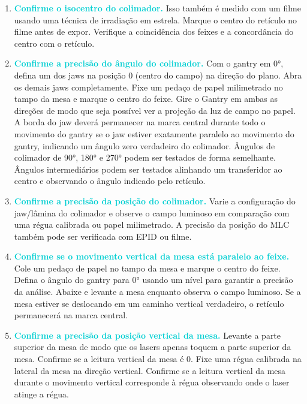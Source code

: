 \documentclass[11pt,a4paper]{article}
\begin{document}
\begin{enumerate}[label=\textcolor{CarnationPink}{\arabic*${}^\circ $}]
		\item \textcolor{DarkTurquoise}{\textbf{Confirme o isocentro do colimador.}} Isso também é medido com um filme usando uma técnica de irradiação em estrela. Marque o centro do retículo no filme antes de expor. Verifique a coincidência dos feixes e a concordância do centro com o retículo.
		
		\item \textcolor{DarkTurquoise}{\textbf{Confirme a precisão do ângulo do colimador.}} Com o gantry em \ang{0}, defina um dos jaws na posição 0 (centro do campo) na direção do plano. Abra os demais jaws completamente. Fixe um pedaço de papel milimetrado no tampo da mesa e marque o centro do feixe. Gire o Gantry em ambas as direções de modo que seja possível ver a projeção da luz de campo no papel. A borda do jaw deverá permanecer na marca central durante todo o movimento do gantry se o jaw estiver exatamente paralelo ao movimento do gantry, indicando um ângulo zero verdadeiro do colimador. Ângulos de colimador de \ang{90}, \ang{180} e \ang{270} podem ser testados de forma semelhante. Ângulos intermediários podem ser testados alinhando um transferidor ao centro e observando o ângulo indicado pelo retículo.
		
		\item \textcolor{DarkTurquoise}{\textbf{Confirme a precisão da posição do colimador.}} Varie a configuração do jaw/lâmina do colimador e observe o campo luminoso em comparação com uma régua calibrada ou papel milimetrado. A precisão da posição do MLC também pode ser verificada com EPID ou filme.
		
		\item \textcolor{DarkTurquoise}{\textbf{Confirme se o movimento vertical da mesa está paralelo ao feixe.}} Cole um pedaço de papel no tampo da mesa e marque o centro do feixe. Defina o ângulo do gantry para \ang{0} usando um nível para garantir a precisão da análise. Abaixe e levante a mesa enquanto observa o campo luminoso. Se a mesa estiver se deslocando em um caminho vertical verdadeiro, o retículo permanecerá na marca central.
		
		\item \textcolor{DarkTurquoise}{\textbf{Confirme a precisão da posição vertical da mesa.}} Levante a parte superior da mesa de modo que os lasers apenas toquem a parte superior da mesa. Confirme se a leitura vertical da mesa é 0. Fixe uma régua calibrada na lateral da mesa na direção vertical. Confirme se a leitura vertical da mesa durante o movimento vertical corresponde à régua observando onde o laser atinge a régua.
		

\end{enumerate}
\end{document}
